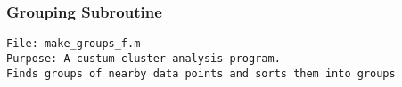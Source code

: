 

\pagebreak
\subsubsection{Grouping Subroutine}
\begin{verbatim} 
File: make_groups_f.m
Purpose: A custum cluster analysis program.
Finds groups of nearby data points and sorts them into groups
\end{verbatim}

